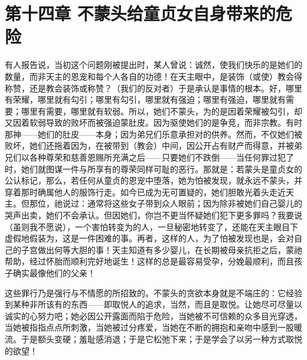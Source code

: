 
\section{第十四章 不蒙头给童贞女自身带来的危险}

有人报告说，当初这个问题刚被提出时，某人曾说：诚然，使我们快乐的是她们的数量，而非天主的恩宠和每个人各自的功德！在天主眼中，是装饰（或使）教会得称赞，还是教会装饰或称赞？（我们的反对者）于是承认是事情的根本。好，哪里有荣耀，哪里就有勾引；哪里有勾引，哪里就有强迫；哪里有强迫，哪里就有需要；哪里有需要，哪里就有软弱。所以，她们不蒙头，为的是因着荣耀被勾引，却又因着软弱导致的败坏而被强迫蒙肚皮。因为驱使她们的是争竞，而非宗教。有时那神——她们的肚皮——本身；因为弟兄们乐意承担对的供养。然而，不仅她们被败坏，她们还拖着因为，在被带到（教会）中间，因公开占有财产而得意，并被弟兄们以各种尊荣和慈善恩赐所充满之后——只要她们不跌倒——当任何罪过犯了时，她们就图谋一件与所享有的尊荣同样可耻的恶行。那就是：若蒙头是童贞女的公认标记，那么，若任何从童贞的恩宠中堕落，她为怕被发现，就永远不蒙头，并穿着那时确属他人的服饰行走。如今已成为无可置疑的，她们胆敢光着头走近天主。但那位，祂说过：通常将这些女子带到众人眼前；因为除非被她们自己婴儿的哭声出卖，她们不会承认。但因她们，你岂不更当怀疑她们犯下更多罪吗？我要说（虽则我不愿说），一个害怕转变为的人，一旦秘密地转变了，还能在天主眼目下虚假地假装为，这是一件困难的事。再者，这样的人，为了怕被发现也是，会对自己的子宫做出何等大胆的事！天主知道有多少婴儿，在长期被母亲抗拒之后，蒙祂帮助，经过怀胎而顺利完好地诞生！这样的总是最容易受孕，分娩最顺利，而且孩子确实最像他们的父亲！\par

这些罪行乃是强行与不情愿的所招致的。不蒙头的贪欲本身就是不端庄的：它经验到某种非所该有的东西——即取悦人的追求，当然，而且是取悦。让她尽可尽量以诚实的心努力吧；她必因公开露面而陷于危险，当她被不可信赖的众多目光穿透，当她被指指点点所刺激，当她被过分疼爱，当她在不断的拥抱和亲吻中感到一股暖流。于是额头变硬；羞耻感消退；于是它松弛下来；于是学会了以另一种方式取悦的欲望！\par


